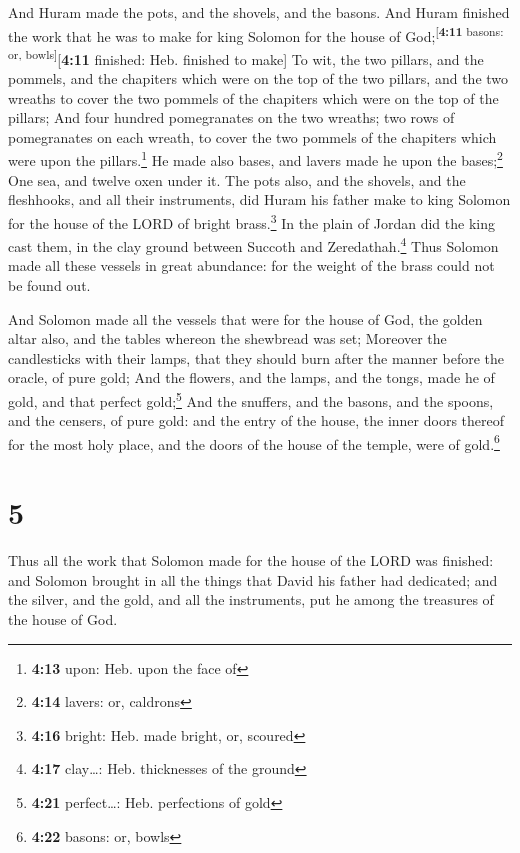  And Huram made the pots, and the shovels, and the
basons. And Huram finished the work that he was to make for king Solomon
for the house of God;\textsuperscript{{[}\textbf{4:11} basons: or,
bowls{]}}{[}\textbf{4:11} finished: Heb. finished to make{]}
 To wit, the two pillars, and the pommels, and the
chapiters which were on the top of the two pillars, and the two wreaths
to cover the two pommels of the chapiters which were on the top of the
pillars;  And four hundred pomegranates on the two
wreaths; two rows of pomegranates on each wreath, to cover the two
pommels of the chapiters which were upon the pillars.\footnote{\textbf{4:13}
  upon: Heb. upon the face of}  He made also bases, and
lavers made he upon the bases;\footnote{\textbf{4:14} lavers: or,
  caldrons}  One sea, and twelve oxen under it.
 The pots also, and the shovels, and the fleshhooks, and
all their instruments, did Huram his father make to king Solomon for the
house of the LORD of bright brass.\footnote{\textbf{4:16} bright: Heb.
  made bright, or, scoured}  In the plain of Jordan did
the king cast them, in the clay ground between Succoth and
Zeredathah.\footnote{\textbf{4:17} clay\ldots: Heb. thicknesses of the
  ground}  Thus Solomon made all these vessels in great
abundance: for the weight of the brass could not be found out.

 And Solomon made all the vessels that were for the house
of God, the golden altar also, and the tables whereon the shewbread was
set;  Moreover the candlesticks with their lamps, that
they should burn after the manner before the oracle, of pure gold;
 And the flowers, and the lamps, and the tongs, made he
of gold, and that perfect gold;\footnote{\textbf{4:21} perfect\ldots:
  Heb. perfections of gold}  And the snuffers, and the
basons, and the spoons, and the censers, of pure gold: and the entry of
the house, the inner doors thereof for the most holy place, and the
doors of the house of the temple, were of gold.\footnote{\textbf{4:22}
  basons: or, bowls}

\hypertarget{section-4}{%
\section{5}\label{section-4}}

 Thus all the work that Solomon made for the house of the
LORD was finished: and Solomon brought in all the things that David his
father had dedicated; and the silver, and the gold, and all the
instruments, put he among the treasures of the house of God.

